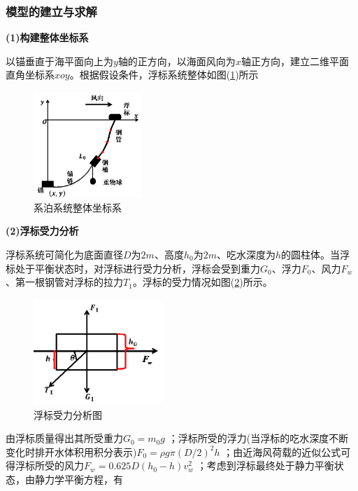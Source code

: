 \documentclass[UTF8]{ctexbook}
\theoremstyle{nonumberplain}
\begin{document}
        \subsubsection{模型的建立与求解}
            \par
            \textbf{(1)构建整体坐标系}
            \par
            以锚垂直于海平面向上为$y$轴的正方向，以海面风向为$x$轴正方向，建立二维平面直角坐标系$xoy$。根据假设条件，浮标系统整体如图(\ref{fig:系泊系统整体坐标系})所示
            \begin{figure}[H]
            \centering
            \includegraphics[height=4cm]{images/xiposystem_aixs.jpg}
            \caption{系泊系统整体坐标系}
            \label{fig:系泊系统整体坐标系}
            \end{figure}
            \par
            \textbf{(2)浮标受力分析}
            \par
            浮标系统可简化为底面直径$D$为$2m$、高度$h_0$为$2m$、吃水深度为$h$的圆柱体。当浮标处于平衡状态时，对浮标进行受力分析，浮标会受到重力$G_0$、浮力$F_0$、风力$F_w$、第一根钢管对浮标的拉力$T_1$。浮标的受力情况如图(\ref{fig:浮标受力分析图})所示。
            \begin{figure}[H]
            \centering
            \includegraphics[height=4cm]{images/pipe_force_analysis.jpg}
            \caption{浮标受力分析图}
            \label{fig:浮标受力分析图}
            \end{figure}
            \par
            由浮标质量得出其所受重力$G_0 = m_0g$ ；浮标所受的浮力(当浮标的吃水深度不断变化时排开水体积用积分表示)$F_0 = \rho g\pi (D/2)^2h$ ；由近海风荷载的近似公式可得浮标所受的风力$F_w = 0.625 D(h_0-h)v_w^2$ ；考虑到浮标最终处于静力平衡状态，由静力学平衡方程，有
\end{document}
